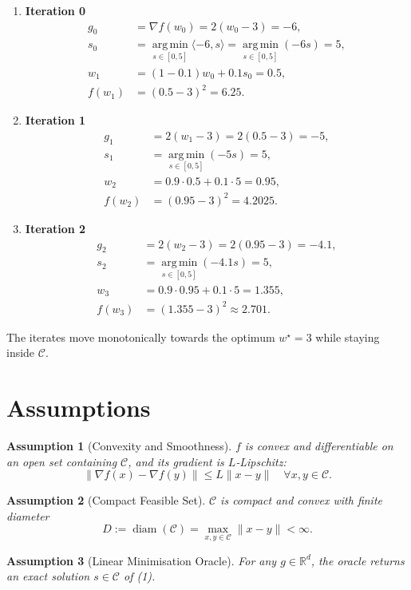 \documentclass{article}
\newtheorem{assumption}{Assumption}
\newcommand{\argmin}{\operatorname*{arg\,min}}
\newcommand{\diam}{\operatorname{diam}}
\begin{document}
\begin{enumerate}[label=Iteration \arabic*:, leftmargin=*]
\item \textbf{Iteration 0}
\[
\begin{aligned}
g_0 &= \nabla f(w_0)=2(w_0-3)=-6,\\
s_0 &= \argmin_{s\in[0,5]}\langle -6,s\rangle =\argmin_{s\in[0,5]}(-6s)=5,\\
w_1 &= (1-0.1) w_0 +0.1 s_0 =0.5,\\
f(w_1) &= (0.5-3)^2 = 6.25 .
\end{aligned}
\]

\item \textbf{Iteration 1}
\[
\begin{aligned}
g_1 &= 2(w_1-3)=2(0.5-3)=-5,\\
s_1 &= \argmin_{s\in[0,5]}(-5s)=5,\\
w_2 &= 0.9\cdot 0.5 +0.1\cdot5 =0.95,\\
f(w_2) &= (0.95-3)^2 = 4.2025 .
\end{aligned}
\]

\item \textbf{Iteration 2}
\[
\begin{aligned}
g_2 &= 2(w_2-3)=2(0.95-3)=-4.1,\\
s_2 &= \argmin_{s\in[0,5]}(-4.1 s)=5,\\
w_3 &= 0.9\cdot0.95+0.1\cdot5 =1.355,\\
f(w_3) &= (1.355-3)^2 \approx 2.701 .
\end{aligned}
\]
\end{enumerate}
The iterates move monotonically towards the optimum $w^\star=3$ while staying inside $\mathcal{C}$.

\newpage
\section*{Assumptions}
\begin{assumption}[Convexity and Smoothness]\label{ass:conv-smooth}
$f$ is convex and differentiable on an open set containing $\mathcal{C}$, and its gradient is $L$‑Lipschitz:
\[
\|\nabla f(x)-\nabla f(y)\|\le L\|x-y\|\quad\forall x,y\in\mathcal{C}.
\]
\end{assumption}
\begin{assumption}[Compact Feasible Set]\label{ass:compact}
$\mathcal{C}$ is compact and convex with finite diameter 
\[
D:=\diam(\mathcal{C}) = \max_{x,y\in\mathcal{C}}\|x-y\| <\infty .
\]
\end{assumption}
\begin{assumption}[Linear Minimisation Oracle]\label{ass:lmo}
For any $g\in\mathbb{R}^d$, the oracle returns an exact solution $s\in\mathcal{C}$ of (1). 
\end{assumption}
\end{document}
